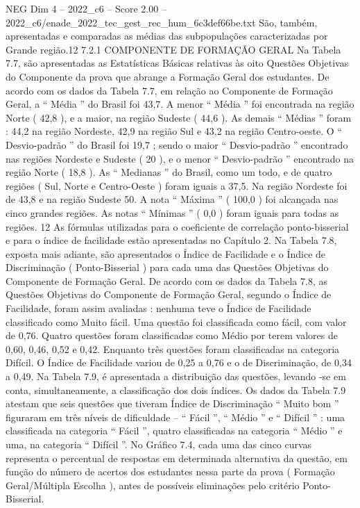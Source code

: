 \begin{textsample}{NEG Dim 4 – 2022\_c6 – Score 2.00 – 2022\_c6/enade\_2022\_tec\_gest\_rec\_hum\_6c3def66be.txt}
São, também, apresentadas e comparadas as médias das subpopulações caracterizadas por Grande região.12 7.2.1 COMPONENTE DE FORMAÇÃO GERAL Na Tabela 7.7, são apresentadas as Estatísticas Básicas relativas às oito Questões Objetivas do Componente da prova que abrange a Formação Geral dos estudantes.
De acordo com os dados da Tabela 7.7, em relação ao Componente de Formação Geral, a “ Média ” do Brasil foi 43,7.
A menor “ Média ” foi encontrada na região Norte ( 42,8 ), e a maior, na região Sudeste ( 44,6 ).
As demais “ Médias ” foram : 44,2 na região Nordeste, 42,9 na região Sul e 43,2 na região Centro-oeste.
O “ Desvio-padrão ” do Brasil foi 19,7 ; sendo o maior “ Desvio-padrão ” encontrado nas regiões Nordeste e Sudeste ( 20 ), e o menor “ Desvio-padrão ” encontrado na região Norte ( 18,8 ).
As “ Medianas ” do Brasil, como um todo, e de quatro regiões ( Sul, Norte e Centro-Oeste ) foram iguais a 37,5.
Na região Nordeste foi de 43,8 e na região Sudeste 50.
A nota “ Máxima ” ( 100,0 ) foi alcançada nas cinco grandes regiões.
As notas “ Mínimas ” ( 0,0 ) foram iguais para todas as regiões. 12 As fórmulas utilizadas para o coeficiente de correlação ponto-bisserial e para o índice de facilidade estão apresentadas no Capítulo 2.
Na Tabela 7.8, exposta mais adiante, são apresentados o Índice de Facilidade e o Índice de Discriminação ( Ponto-Bisserial ) para cada uma das Questões Objetivas do Componente de Formação Geral.
De acordo com os dados da Tabela 7.8, as Questões Objetivas do Componente de Formação Geral, segundo o Índice de Facilidade, foram assim avaliadas : nenhuma teve o Índice de Facilidade classificado como Muito fácil.
Uma questão foi classificada como fácil, com valor de 0,76.
Quatro questões foram classificadas como Médio por terem valores de 0,60, 0,46, 0,52 e 0,42.
Enquanto três questões foram classificadas na categoria Difícil.
O Índice de Facilidade variou de 0,25 a 0,76 e o de Discriminação, de 0,34 a 0,49.
Na Tabela 7.9, é apresentada a distribuição das questões, levando -se em conta, simultaneamente, a classificação dos dois índices.
Os dados da Tabela 7.9 atestam que seis questões que tiveram Índice de Discriminação “ Muito bom ” figuraram em três níveis de dificuldade – “ Fácil ”, “ Médio ” e “ Difícil ” : uma classificada na categoria “ Fácil ”, quatro classificadas na categoria “ Médio ” e uma, na categoria “ Difícil ”.
No Gráfico 7.4, cada uma das cinco curvas representa o percentual de respostas em determinada alternativa da questão, em função do número de acertos dos estudantes nessa parte da prova ( Formação Geral/Múltipla Escolha ), antes de possíveis eliminações pelo critério Ponto-Bisserial.

\end{textsample}
